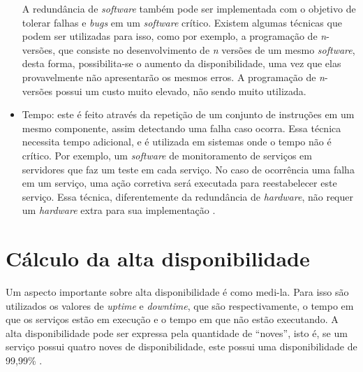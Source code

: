 \begin{itemize}
 A redundância de \textit{software} também pode ser implementada com o objetivo de tolerar falhas e \textit{bugs} em um \textit{software} 
 crítico. Existem algumas técnicas que podem ser utilizadas para isso, como por exemplo, a programação de \textit{n}-versões, que consiste 
 no desenvolvimento de \textit{n} versões de um mesmo \textit{software}, desta forma, possibilita-se o aumento da disponibilidade, uma vez que 
 elas provavelmente não apresentarão os mesmos erros. A programação de \textit{n}-versões possui um custo muito elevado, não sendo muito 
 utilizada.
 \item Tempo: este é feito através da repetição de um conjunto de instruções em um mesmo componente, assim detectando uma falha caso ocorra. 
 Essa técnica necessita tempo adicional, e é utilizada em sistemas onde o tempo não é crítico. Por exemplo, um \textit{software} de 
 monitoramento de serviços em servidores que faz um teste em cada serviço. No caso de ocorrência uma falha em um serviço, uma ação corretiva 
 será executada para reestabelecer este serviço. Essa técnica, diferentemente da redundância de \textit{hardware}, não requer um 
 \textit{hardware} extra para sua implementação \cite{costa2009}.
\end{itemize}

\section{Cálculo da alta disponibilidade}

Um aspecto importante sobre alta disponibilidade é como medi-la. Para isso são utilizados os valores de \textit{uptime} e \textit{downtime}, 
que são respectivamente, o tempo em que os serviços estão em execução e o tempo em que não estão executando. A alta disponibilidade 
pode ser expressa pela quantidade de ``noves'', isto é, se um serviço possui quatro noves de disponibilidade, este possui uma 
disponibilidade de 99,99\% \cite{pereirafilho2004}.

